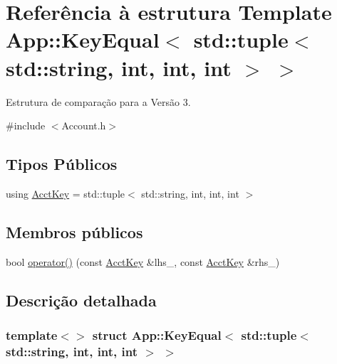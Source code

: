 \hypertarget{structApp_1_1KeyEqual_3_01std_1_1tuple_3_01std_1_1string_00_01int_00_01int_00_01int_01_4_01_4}{}\section{Referência à estrutura Template App\+:\+:Key\+Equal$<$ std\+:\+:tuple$<$ std\+:\+:string, int, int, int $>$ $>$}
\label{structApp_1_1KeyEqual_3_01std_1_1tuple_3_01std_1_1string_00_01int_00_01int_00_01int_01_4_01_4}


Estrutura de comparação para a Versão 3.  




{\ttfamily \#include $<$Account.\+h$>$}

\subsection*{Tipos Públicos}
\begin{DoxyCompactItemize}
\item 
using \hyperlink{structApp_1_1KeyEqual_3_01std_1_1tuple_3_01std_1_1string_00_01int_00_01int_00_01int_01_4_01_4_ad9c6d18451a835ce0b45f14d6a991e61}{Acct\+Key} = std\+::tuple$<$ std\+::string, int, int, int $>$
\end{DoxyCompactItemize}
\subsection*{Membros públicos}
\begin{DoxyCompactItemize}
\item 
bool \hyperlink{structApp_1_1KeyEqual_3_01std_1_1tuple_3_01std_1_1string_00_01int_00_01int_00_01int_01_4_01_4_a3ec86b197fb10191f31480bf03493023}{operator()} (const \hyperlink{structApp_1_1KeyEqual_3_01std_1_1tuple_3_01std_1_1string_00_01int_00_01int_00_01int_01_4_01_4_ad9c6d18451a835ce0b45f14d6a991e61}{Acct\+Key} \&lhs\+\_\+, const \hyperlink{structApp_1_1KeyEqual_3_01std_1_1tuple_3_01std_1_1string_00_01int_00_01int_00_01int_01_4_01_4_ad9c6d18451a835ce0b45f14d6a991e61}{Acct\+Key} \&rhs\+\_\+)
\end{DoxyCompactItemize}


\subsection{Descrição detalhada}
\subsubsection*{template$<$$>$\newline
struct App\+::\+Key\+Equal$<$ std\+::tuple$<$ std\+::string, int, int, int $>$ $>$}

